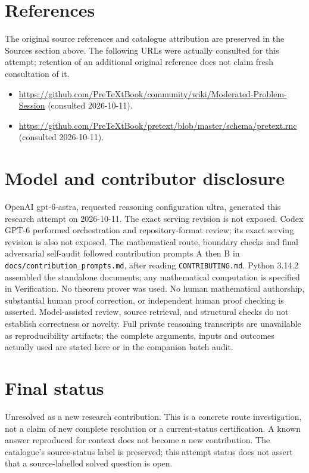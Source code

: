 \documentclass[11pt]{article}
\begin{document}
\section{References}
The original source references and catalogue attribution are preserved in the
Sources section above. The following URLs were actually consulted for this attempt;
retention of an additional original reference does not claim fresh consultation of it.
\begin{itemize}
\item \url{https://github.com/PreTeXtBook/community/wiki/Moderated-Problem-Session} (consulted 2026-10-11). 
\item \url{https://github.com/PreTeXtBook/pretext/blob/master/schema/pretext.rnc} (consulted 2026-10-11). 
\end{itemize}
\section{Model and contributor disclosure}
OpenAI gpt-6-astra, requested reasoning configuration ultra, generated this research
attempt on 2026-10-11. The exact serving revision is not exposed. Codex GPT-6
performed orchestration and repository-format review; its exact serving revision
is also not exposed. The mathematical route, boundary checks and final adversarial
self-audit followed contribution prompts A then B in
\texttt{docs/contribution\_prompts.md}, after reading \texttt{CONTRIBUTING.md}.
Python 3.14.2 assembled the standalone documents; any mathematical computation is
specified in Verification. No theorem prover was used. No human mathematical
authorship, substantial human proof correction, or independent human proof checking
is asserted. Model-assisted review, source retrieval, and structural checks do not
establish correctness or novelty. Full private reasoning transcripts are unavailable
as reproducibility artifacts; the complete arguments, inputs and outcomes actually
used are stated here or in the companion batch audit.
\section{Final status}
Unresolved as a new research contribution. This is a concrete route investigation,
not a claim of new complete resolution or a current-status certification. A known
answer reproduced for context does not become a new contribution. The catalogue's
source-status label is preserved; this attempt status does not assert that a
source-labelled solved question is open.
\end{document}
